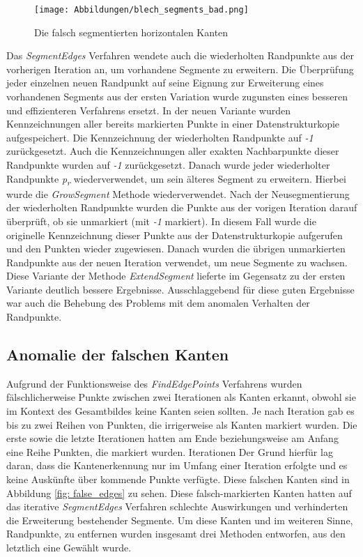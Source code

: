 \begin{figure}[h]
	\texttt{[image: Abbildungen/blech\_segments\_bad.png]}
	\centering
	\caption{Die falsch segmentierten horizontalen Kanten}
	\label{fig: bad_segments}
\end{figure}

Das \textit{SegmentEdges} Verfahren wendete auch die wiederholten Randpunkte aus der vorherigen Iteration an, um vorhandene Segmente zu erweitern. Die Überprüfung jeder einzelnen neuen Randpunkt auf seine Eignung zur Erweiterung eines vorhandenen Segments aus der ersten Variation wurde zugunsten eines besseren und effizienteren Verfahrens ersetzt. In der neuen Variante wurden Kennzeichnungen aller bereits markierten Punkte in einer Datenstrukturkopie aufgespeichert. Die Kennzeichnung der wiederholten Randpunkte auf \textit{-1} zurückgesetzt. Auch die Kennzeichnungen aller exakten Nachbarpunkte dieser Randpunkte wurden auf \textit{-1} zurückgesetzt. Danach wurde jeder wiederholter Randpunkte \textit{p\textsubscript{r}} wiederverwendet, um sein älteres Segment zu erweitern. Hierbei wurde die \textit{GrowSegment} Methode wiederverwendet. Nach der Neusegmentierung der wiederholten Randpunkte wurden die Punkte aus der vorigen Iteration darauf überprüft, ob sie unmarkiert (mit \textit{-1} markiert). In diesem Fall wurde die originelle Kennzeichnung dieser Punkte aus der Datenstrukturkopie aufgerufen und den Punkten wieder zugewiesen. Danach wurden die übrigen unmarkierten Randpunkte aus der neuen Iteration verwendet, um neue Segmente zu wachsen. Diese Variante der Methode \textit{ExtendSegment} lieferte im Gegensatz zu der ersten Variante deutlich bessere Ergebnisse. Ausschlaggebend für diese guten Ergebnisse war auch die Behebung des Problems mit dem anomalen Verhalten der Randpunkte.

\subsection{Anomalie der falschen Kanten} \label{false_edges}
Aufgrund der Funktionsweise des \textit{FindEdgePoints} Verfahrens wurden fälschlicherweise Punkte zwischen zwei Iterationen als Kanten erkannt, obwohl sie im Kontext des Gesamtbildes keine Kanten seien sollten. Je nach Iteration gab es bis zu zwei Reihen von Punkten, die irrigerweise als Kanten markiert wurden. Die erste sowie die letzte Iterationen hatten am Ende beziehungsweise am Anfang eine Reihe Punkten, die markiert wurden. Iterationen  Der Grund hierfür lag daran, dass die Kantenerkennung nur im Umfang einer Iteration erfolgte und es keine Auskünfte über kommende Punkte verfügte. Diese falschen Kanten sind in Abbildung \ref{fig: false_edges} zu sehen. Diese falsch-markierten Kanten hatten auf das iterative \textit{SegmentEdges} Verfahren schlechte Auswirkungen und verhinderten die Erweiterung bestehender Segmente. Um diese Kanten und im weiteren Sinne, Randpunkte, zu entfernen wurden insgesamt drei Methoden entworfen, aus den letztlich eine Gewählt wurde.

